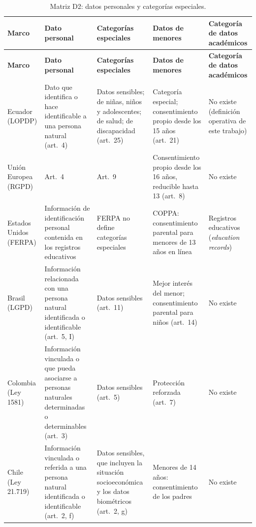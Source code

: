 {\scriptsize
\renewcommand{\arraystretch}{1.12}
\begin{xltabular}{\textwidth}{|>{\raggedright\arraybackslash}p{2.0cm}|L|L|L|L|}
  \caption{Matriz D2: datos personales y categorías especiales.}
  \label{tab:matriz_d2} \\
  \hline
  \textbf{Marco} & \textbf{Dato personal} & \textbf{Categorías especiales} & \textbf{Datos de menores} & \textbf{Categoría de datos académicos} \\
  \hline
  \endfirsthead
  \hline
  \textbf{Marco} & \textbf{Dato personal} & \textbf{Categorías especiales} & \textbf{Datos de menores} & \textbf{Categoría de datos académicos} \\
  \hline
  \endhead
  \hline
  \endlastfoot
  Ecuador (LOPDP) & Dato que identifica o hace identificable a una persona natural (art.~4) & Datos sensibles; de niñas, niños y adolescentes; de salud; de discapacidad (art.~25) & Categoría especial; consentimiento propio desde los 15 años (art.~21) & No existe (definición operativa de este trabajo) \\ \hline
  Unión Europea (RGPD) & Art.~4 \cite{rgpd2016} & Art.~9 \cite{rgpd2016} & Consentimiento propio desde los 16 años, reducible hasta 13 (art.~8) & No existe \\ \hline
  Estados Unidos (FERPA) & Información de identificación personal contenida en los registros educativos \cite{ferpa34cfr} & FERPA no define categorías especiales & COPPA: consentimiento parental para menores de 13 años en línea \cite{coppa1998} & Registros educativos (\textit{education records}) \cite{ferpa1974} \\ \hline
  Brasil (LGPD) & Información relacionada con una persona natural identificada o identificable (art.~5, I) & Datos sensibles (art.~11) \cite{brasil2018lgpd} & Mejor interés del menor; consentimiento parental para niños (art.~14) & No existe \\ \hline
  Colombia (Ley 1581) & Información vinculada o que pueda asociarse a personas naturales determinadas o determinables (art.~3) & Datos sensibles (art.~5) \cite{colombia2012ley1581} & Protección reforzada (art.~7) & No existe \\ \hline
  Chile (Ley 21.719) & Información vinculada o referida a una persona natural identificada o identificable (art.~2, f) & Datos sensibles, que incluyen la situación socioeconómica y los datos biométricos (art.~2, g) & Menores de 14 años: consentimiento de los padres \cite{chile2024ley21719} & No existe \\ \hline
\end{xltabular}
}

